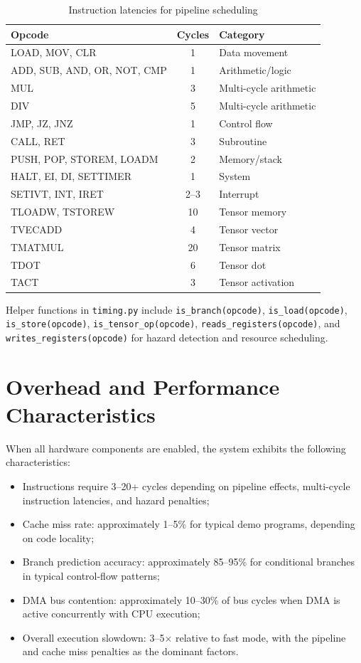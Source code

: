 \documentclass[10pt,a4paper,twoside]{book}
\begin{document}
\begin{table}[H]
\centering
\caption{Instruction latencies for pipeline scheduling}
\label{tab:ilatencies}
\begin{tabular}{lcl}
\toprule
Opcode & Cycles & Category \\
\midrule
LOAD, MOV, CLR & 1 & Data movement \\
ADD, SUB, AND, OR, NOT, CMP & 1 & Arithmetic/logic \\
MUL & 3 & Multi-cycle arithmetic \\
DIV & 5 & Multi-cycle arithmetic \\
JMP, JZ, JNZ & 1 & Control flow \\
CALL, RET & 3 & Subroutine \\
PUSH, POP, STOREM, LOADM & 2 & Memory/stack \\
HALT, EI, DI, SETTIMER & 1 & System \\
SETIVT, INT, IRET & 2--3 & Interrupt \\
TLOADW, TSTOREW & 10 & Tensor memory \\
TVECADD & 4 & Tensor vector \\
TMATMUL & 20 & Tensor matrix \\
TDOT & 6 & Tensor dot \\
TACT & 3 & Tensor activation \\
\bottomrule
\end{tabular}
\end{table}

Helper functions in \texttt{timing.py} include \texttt{is\_branch(opcode)},
\texttt{is\_load(opcode)}, \texttt{is\_store(opcode)},
\texttt{is\_tensor\_op(opcode)}, \texttt{reads\_registers(opcode)}, and
\texttt{writes\_registers(opcode)} for hazard detection and resource
scheduling.

\section{Overhead and Performance Characteristics}

When all hardware components are enabled, the system exhibits the following
characteristics:

\begin{itemize}
    \item Instructions require 3--20+ cycles depending on pipeline effects,
          multi-cycle instruction latencies, and hazard penalties;
    \item Cache miss rate: approximately 1--5\% for typical demo programs,
          depending on code locality;
    \item Branch prediction accuracy: approximately 85--95\% for conditional
          branches in typical control-flow patterns;
    \item DMA bus contention: approximately 10--30\% of bus cycles when DMA
          is active concurrently with CPU execution;
    \item Overall execution slowdown: 3--5$\times$ relative to fast mode,
          with the pipeline and cache miss penalties as the dominant factors.
\end{itemize}
\end{document}
